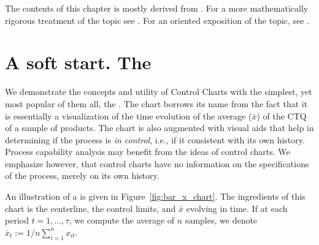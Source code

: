 \begin{extra}
The contents of this chapter is mostly derived from \cite{montgomery_introduction_2007}. 
For a more mathematically rigorous treatment of the topic see \cite{basseville_detection_1993}.
For an \R oriented exposition of the topic, see \cite{qiu_introduction_2013}.
\end{extra}

\section{A soft start. The \barxChart}




We demonstrate the concepts and utility of Control Charts with the simplest, yet most popular of them all, the \barxChart. 
The chart borrows its name from the fact that it is essentially a visualization of the time evolution of the average ($\bar{x}$) of the CTQ of a sample of products. 
The chart is also augmented with visual aids that help in determining if the process is \emph{in control}, i.e., if it consistent with its own history. 
Process capability analysis may benefit from the ideas of control charts. We emphasize however, that control charts have no information on the specifications of the process, merely on its own history.

An illustration of a \barxChart is given in Figure~\ref{fig:bar_x_chart}. 
The ingredients of this chart is the centerline, the control limits, and $\bar{x}$ evolving in time. 
If at each period $t=1,\dots,\tau$, we compute the average of $n$ samples, we denote $\bar{x}_t:=1/n \sum_{i=1}^n x_{it}$.


